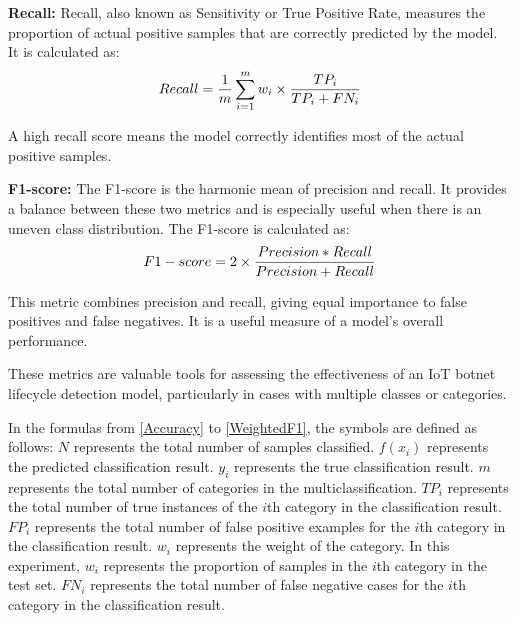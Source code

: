\documentclass[journal]{IEEEtai}
\begin{document}
\textbf{Recall:} Recall, also known as Sensitivity or True Positive Rate, measures the proportion of actual positive samples that are correctly predicted by the model. 
It is calculated as:
\begin{align}
\small
	\begin{split}
		Recall  =\frac{1}{m} \sum_{i=1}^{m} w_{i} \times \frac{T P_{i}}{T P_{i}+F N_{i}} 
	\end{split}
	\label{WeightedR}
\end{align}

A high recall score means the model correctly identifies most of the actual positive samples.

\textbf{F1-score: }The F1-score is the harmonic mean of precision and recall. 
It provides a balance between these two metrics and is especially useful when there is an uneven class distribution. 
The F1-score is calculated as:
\begin{align}
\small
	\begin{split}
	   F1-score = 2 \times \frac{ Precision * Recall}{ Precision+ Recall}
	\end{split}
	\label{WeightedF1}
\end{align}

This metric combines precision and recall, giving equal importance to false positives and false negatives. 
It is a useful measure of a model's overall performance.

These metrics are valuable tools for assessing the effectiveness of an IoT botnet lifecycle detection model, particularly in cases with multiple classes or categories.



In the formulas from \eqref{Accuracy} to \eqref{WeightedF1}, the symbols are defined as follows:
$N$ represents the total number of samples classified.
$f(x_i)$ represents the predicted classification result.
$y_i$ represents the true classification result.
$m$ represents the total number of categories in the multiclassification.
$TP_i$ represents the total number of true instances of the $i$th category in the classification result.
$FP_i$ represents the total number of false positive examples for the $i$th category in the classification result.
$w_i$ represents the weight of the category. In this experiment, $w_i$ represents the proportion of samples in the $i$th category in the test set.
$FN_i$ represents the total number of false negative cases for the $i$th category in the classification result.
\end{document}
